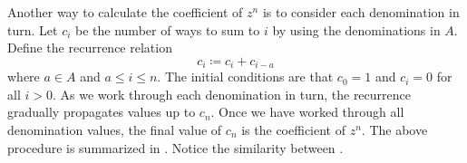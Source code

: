 Another way to calculate the coefficient of $z^n$ is to consider each
denomination in turn.  Let $c_i$ be the number of ways to sum to $i$
by using the denominations in $A$.  Define the recurrence relation
\begin{equation}
\label{eqn:sum2:recurrence_relation}
c_i
\coloneqq
c_i + c_{i-a}
\end{equation}
where $a \in A$ and $a \leq i \leq n$.  The initial conditions are
that $c_0 = 1$ and $c_i = 0$ for all $i > 0$.  As we work through each
denomination in turn, the recurrence
 gradually propagates values up
to $c_n$.  Once we have worked through all denomination values, the
final value of $c_n$ is the coefficient of $z^n$.  The above procedure
is summarized in .  Notice the
similarity between
.

\begin{algorithm}[!htbp]

\caption{%
  The number of ways to change money.
}
\label{alg:sum2:recurrence_relation}
\end{algorithm}
